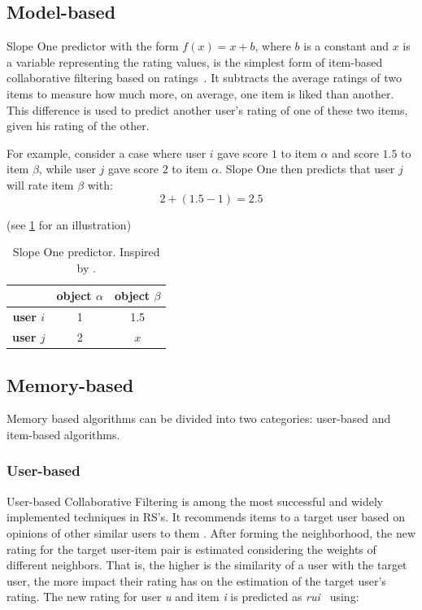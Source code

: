 \documentclass[10pt,twoside,english,a4paper]{article}
\begin{document}
\subsection{Model-based}
Slope One predictor with the form \( f(x) = x + b \), where \( b \) is a constant and \( x \) is a variable representing the rating values, is the simplest form of item-based collaborative filtering based on ratings~\cite{doi:10.1137/1.9781611972757.43}. It subtracts the average ratings of two items to measure how much more, on average, one item is liked than another. This difference is used to predict another user's rating of one of these two items, given his rating of the other.

For example, consider a case where user \( i \) gave score \( 1 \) to item \( \alpha \) and score \( 1.5 \) to item \( \beta \), while user \( j \) gave score \( 2 \) to item \( \alpha \). Slope One then predicts that user \( j \) will rate item \( \beta \) with:
\[
2 + (1.5 - 1) = 2.5
\]

(see \ref{fig:slope_one} for an illustration)

\begin{table}[h!]
    \centering
    \begin{tabular}{|c|c|c|}
    \hline
              & \textbf{object $\alpha$} & \textbf{object $\beta$} \\ \hline
    \textbf{user $i$} & 1                   & 1.5                   \\ \hline
    \textbf{user $j$} & 2                   & $x$                   \\ \hline
    \end{tabular}
    \caption{Slope One predictor. Inspired by \cite{LU20121}.}
    \label{fig:slope_one}
\end{table}


\subsection{Memory-based}
Memory based algorithms can be divided into two categories:
user-based\cite{WANG2017102} and item-based algorithms.
\medskip

\subsubsection{User-based}
User-based Collaborative Filtering is among the most successful and widely implemented techniques in RS's. It recommends items to a target user based on opinions of other similar users to them . After forming the neighborhood, the new rating for the target user-item pair is estimated considering the weights of different neighbors. That is, the higher is the similarity of a user with the target user, the more impact their rating has on the estimation of the target user’s rating. The new rating for user \textit{u} and item \textit{i} is predicted as \textit{rui~} using: \cite{8550639}
\end{document}
